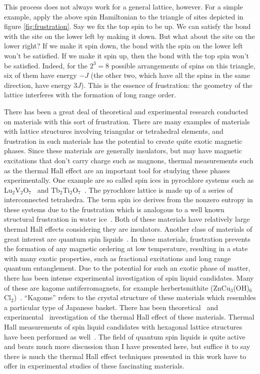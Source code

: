 \documentclass{thesis-umich}
\begin{document}
This process does not always work for a general lattice, however. For a simple example, apply the above spin Hamiltonian to the triangle of sites depicted in figure \ref{fig:frustration}. Say we fix the top spin to be up. We can satisfy the bond with the site on the lower left by making it down. But what about the site on the lower right? If we make it spin down, the bond with the spin on the lower left won't be satisfied. If we make it spin up, then the bond with the top spin won't be satisfied. Indeed, for the $2^3 = 8$ possible arrangements of spins on this triangle, six of them have energy $-J$ (the other two, which have all the spins in the same direction, have energy $3J$). This is the essence of frustration: the geometry of the lattice interferes with the formation of long range order.

There has been a great deal of theoretical and experimental research conducted on materials with this sort of frustration. There are many examples of materials with lattice structures involving triangular or tetrahedral elements, and frustration in such materials has the potential to create quite exotic magnetic phases. Since these materials are generally insulators, but may have magnetic excitations that don't carry charge such as magnons, thermal measurements such as the thermal Hall effect are an important tool for studying these phases experimentally. One example are so called spin ices in pyrochlore systems such as Lu$_2$V$_2$O$_7$~\cite{Onose2010} and Tb$_2$Ti$_2$O$_7$~\cite{Hirschberger2015}. The pyrochlore lattice is made up of a series of interconnected tetrahedra. The term spin ice derives from the nonzero entropy in these systems due to the frustration which is analogous to a well known structural frustration in water ice~\cite{Giauque1936}. Both of these materials have relatively large thermal Hall effects considering they are insulators. Another class of materials of great interest are quantum spin liquids~\cite{Anderson1973}. In these materials, frustration prevents the formation of any magnetic ordering at low temperature, resulting in a state with many exotic properties, such as fractional excitations and long range quantum entanglement. Due to the potential for such an exotic phase of matter, there has been intense experimental investigation of spin liquid candidates. Many of these are kagome antiferromagnets, for example herbertsmithite (ZnCu$_3$(OH)$_6$Cl$_2$)~\cite{Asaba2014}. ``Kagome'' refers to the crystal structure of these materials which resembles a particular type of Japanese basket. There has been theoretical~\cite{Owerre2017} and experimental~\cite{Doki2018} investigation of the thermal Hall effect of these materials. Thermal Hall measurements of spin liquid candidates with hexagonal lattice structures have been performed as well~\cite{Kasahara2018}. The field of quantum spin liquids is quite active and bears much more discussion than I have presented here, but suffice it to say there is much the thermal Hall effect techniques presented in this work have to offer in experimental studies of these fascinating materials.
\end{document}
